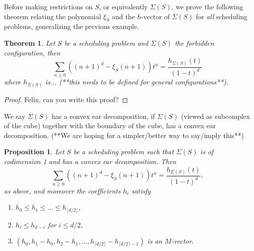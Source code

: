 \documentclass[12pt,reqno]{amsart}
\numberwithin{definition}{section}
\newtheorem{proposition}[definition]{Proposition}
\newtheorem{theorem}[definition]{Theorem}
\theoremstyle{definition}
\newcommand{\SSS}{\mathcal{S}}
\newcommand{\floor}[1]{\lfloor {#1} \rfloor}
\newcommand{\ceil}[1]{\lceil {#1} \rceil}
\begin{document}
Before making restrictions on $S$, or equivalently $\Sigma(S)$, we
prove the following theorem relating the polynomial $\xi_S$ and the
$h$-vector of $\Sigma(S)$ for \emph{all} scheduling problems, generalizing the previous example.

\begin{theorem}
\label{Hilbert}
Let $S$ be a scheduling problem and $\Sigma(S)$ the forbidden configuration, then
$$ \sum_{n \geq 0} ((n+1)^d - \xi_S(n+1)) t^n = \frac{h_{\Sigma(S)}(t)}{(1-t)^d} $$
where $h_{\Sigma(S)}$ is... (**this needs to be defined for general configurations**).
\end{theorem}
\begin{proof}
Felix, can you write this proof?
\end{proof}



We say $\Sigma(S)$ has a convex ear
decomposition, if $\Sigma(S)$ (viewed as subcomplex of the cube)
together with the boundary of the cube, has a convex ear
decomposition. (**We are hoping for a simpler/better way to say/imply this**)


\begin{proposition}
Let $S$ be a scheduling problem such that $\Sigma(S)$ is of codimension 1 and has a convex ear decomposition. Then 
\[
  \sum_{n \geq 0} ((n+1)^d - \xi_S(n+1)) t^n = \frac{h_{\Sigma(S)}(t)}{(1-t)^d},
\]
as above, and moreover the coefficients $h_i$ satisfy
\begin{enumerate}
\item $h_0 \leq h_1 \leq \ldots \leq h_{\floor{d/2}}$,
\item $h_i\leq h_{d-i}$ for $i\leq d/2$,
\item $(h_0,h_1-h_0,h_2-h_1,\ldots,h_{\ceil{d/2}}-h_{\ceil{d/2}-1})$ is an $M$-vector.
\end{enumerate}
\end{proposition}
\end{document}
